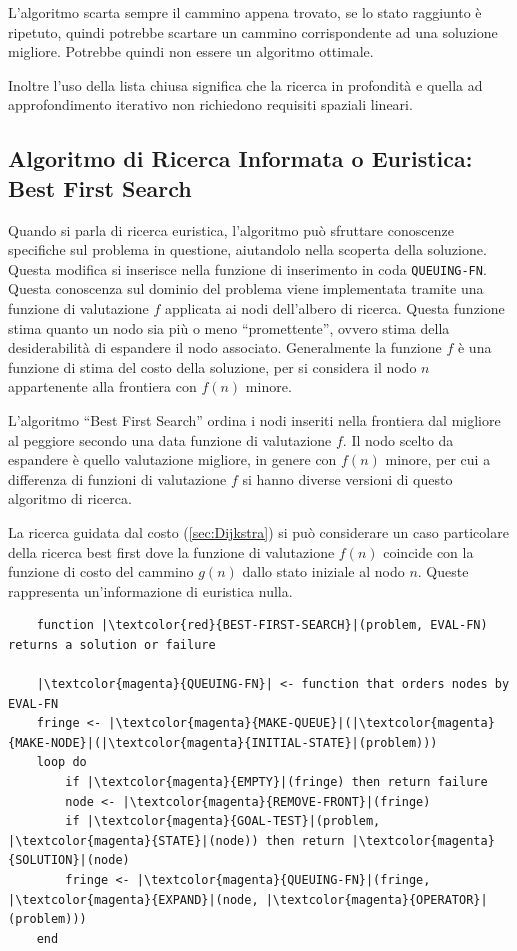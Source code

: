 \documentclass{article}
\numberwithin{equation}{subsection}
\begin{document}
L'algoritmo scarta sempre il cammino appena trovato, se lo stato raggiunto è ripetuto, quindi 
potrebbe scartare un cammino corrispondente ad una soluzione migliore. Potrebbe quindi 
non essere un algoritmo ottimale. 

Inoltre l'uso della lista chiusa significa che la ricerca in profondità e quella ad 
approfondimento iterativo non richiedono requisiti spaziali lineari. 

\subsection{Algoritmo di Ricerca Informata o Euristica: Best First Search}

Quando si parla di ricerca euristica, l'algoritmo può sfruttare conoscenze specifiche sul problema in questione, aiutandolo nella scoperta della soluzione. 
Questa modifica si inserisce nella funzione di inserimento in coda \color{magenta}\verb|QUEUING-FN|\color{black}. Questa conoscenza sul dominio del problema viene implementata tramite una funzione di valutazione $f$ 
applicata ai nodi dell'albero di ricerca. 
Questa funzione stima quanto un nodo sia più o meno ``promettente'', ovvero stima della desiderabilità di espandere il nodo associato. Generalmente la funzione $f$ è 
una funzione di stima del costo della soluzione, per si considera il nodo $n$ appartenente alla frontiera con $f(n)$ minore. 

L'algoritmo ``Best First Search'' ordina i nodi inseriti nella frontiera dal migliore al peggiore secondo una data funzione di valutazione $f$. Il nodo scelto da espandere 
è quello valutazione migliore, in genere con $f(n)$ minore, per cui a differenza di funzioni di valutazione $f$ si hanno diverse versioni di questo algoritmo di ricerca. 

La ricerca guidata dal costo (\ref{sec:Dijkstra}) si può considerare un caso particolare della ricerca best first dove la funzione di valutazione $f(n)$ coincide 
con la funzione di costo del cammino $g(n)$ dallo stato iniziale al nodo $n$. Queste rappresenta un'informazione di euristica nulla. 

\begin{verbatim}
    function |\textcolor{red}{BEST-FIRST-SEARCH}|(problem, EVAL-FN) returns a solution or failure
    
    |\textcolor{magenta}{QUEUING-FN}| <- function that orders nodes by EVAL-FN
    fringe <- |\textcolor{magenta}{MAKE-QUEUE}|(|\textcolor{magenta}{MAKE-NODE}|(|\textcolor{magenta}{INITIAL-STATE}|(problem)))
    loop do
        if |\textcolor{magenta}{EMPTY}|(fringe) then return failure
        node <- |\textcolor{magenta}{REMOVE-FRONT}|(fringe)
        if |\textcolor{magenta}{GOAL-TEST}|(problem, |\textcolor{magenta}{STATE}|(node)) then return |\textcolor{magenta}{SOLUTION}|(node)
        fringe <- |\textcolor{magenta}{QUEUING-FN}|(fringe, |\textcolor{magenta}{EXPAND}|(node, |\textcolor{magenta}{OPERATOR}|(problem)))
    end
\end{verbatim}
\end{document}
